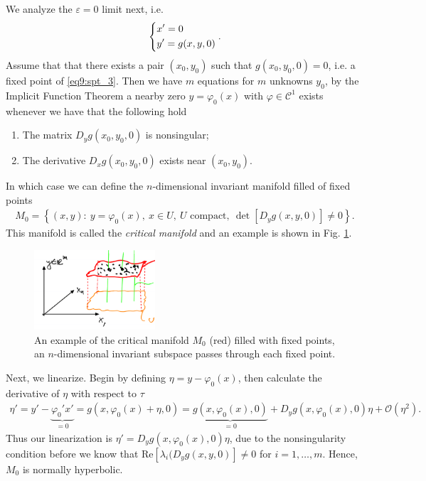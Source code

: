 We analyze the $\varepsilon=0$ limit next, i.e.
\begin{align}
	\begin{dcases}
		x' = 0 \\
		y' = g(x,y,0)
	\end{dcases}
	.\label{eq9:spt_3}
\end{align}
Assume that that there exists a pair $(x_0, y_0)$ such that $g(x_0, y_0,0)=0$, i.e. a fixed point of \eqref{eq9:spt_3}. Then we have $m$ equations for $m$ unknowns $y_0$, by the Implicit Function Theorem a nearby zero $y = \varphi_0(x)$ with $\varphi \in \mathcal{C}^{1}$ exists whenever we have that the following hold
\begin{enumerate}
	\item The matrix $D_{y}g(x_0, y_0, 0)$ is nonsingular;
	\item The derivative $D_{x}g(x_0, y_0, 0)$ exists near $(x_0, y_0)$.
\end{enumerate}
In which case we can define the $n$-dimensional invariant manifold filled of fixed points 
\begin{align}
\boxed{
M_0 = \left\{ (x,y):\ y= \varphi_0(x),\ x\in U,\ U  \textrm{ compact},\ \det\left[D_{y}g(x,y,0)\right]\neq 0 \right\} .
}
\end{align}
This manifold is called the \emph{critical manifold} and an example is shown in Fig. \ref{fig:critical_mfd_def}.
\begin{figure}[h!]
	\centering
	\includegraphics[width=0.4\textwidth]{figures/ch9/17crit_mfd_def.png}
	\caption{An example of the critical manifold $M_0$ (red) filled with fixed points, an $n$-dimensional invariant subspace passes through each fixed point.}
	\label{fig:critical_mfd_def}
\end{figure}

Next, we linearize. Begin by defining $\eta = y - \varphi_0(x)$, then calculate the derivative of $\eta $ with respect to $\tau$ 
\begin{align}
	\eta' = y' - \underbrace{\varphi_0' x'}_{=0} = g(x, \varphi_0(x) + \eta, 0) = \underbrace{g(x, \varphi_0(x), 0) }_{=0} + D_{y}g(x, \varphi_0(x), 0) \eta + \mathcal{O}(\eta^2).
\end{align}
Thus our linearization is $\eta' = D_{y} g(x, \varphi_0(x), 0 ) \eta$, due to the nonsingularity condition before we know that $ \textrm{Re}[\lambda_i(D_{y}g(x,y,0)]\neq 0  $ for $i = 1, \ldots, m$. Hence, $M_0$ is normally hyperbolic.

